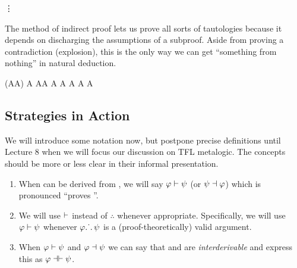 \begin{fitchrule}
  \label{def:indirect-proof-rule}
  \leavevmode
  \vspace{-0.9\baselineskip}
  \begin{fitchproof}
    \open
     {\enot\ephi} 
     {\vdots}
     {\ebot}
    \close
     {\phi}       
  \end{fitchproof}      
\end{fitchrule}

The method of indirect proof lets us prove all sorts of tautologies because it
depends on discharging the assumptions of a subproof. Aside from proving a
contradiction (explosion), this is the only way we can get ``something from
nothing'' in natural deduction.

\begin{fitchproof}
  \open
   {\enot(A\eor\enot A)} 
  \open
   {A}                   
   {A\eor\enot A}        
   {\ebot}               
  \close
   {\enot A}             
   {A \eor\enot A}       
   {\ebot}               
  \close
   {A \eor\enot A}        

\end{fitchproof}      

\subsection{Strategies in Action}

We will introduce some notation now, but postpone precise definitions until
Lecture 8 when we will focus our discussion on TFL metalogic. The concepts
should be more or less clear in their informal presentation.

\begin{enumerate}
\item When \spsi can be derived from \ephi, we will say $\varphi\vdash\psi$
  (or $\psi\dashv\varphi$) which is pronounced ``\ephi proves \epsi''.
\item We will use $\vdash$ instead of $\therefore$ whenever appropriate.
  Specifically, we will use $\varphi\vdash\psi$ whenever $\varphi\ldotp\dot{}\,\ldotp\psi$
  is a (proof-theoretically) valid argument.
\item When $\varphi\vdash\psi$ and $\varphi\dashv\psi$ we can say that \sphi
  and \spsi are \emph{interderivable} and express this as
  $\varphi\dashv\vdash\psi$.
\end{enumerate}


